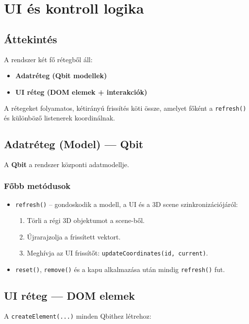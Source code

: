 \documentclass[12pt]{article}
\begin{document}
    \section{UI és kontroll logika}

    \subsection{Áttekintés}
	A rendszer két fő rétegből áll: 
	
	\begin{itemize}
		\item \textbf{Adatréteg (Qbit modellek)}
		\item \textbf{UI réteg (DOM elemek + interakciók)}
	\end{itemize}
	
	A rétegeket folyamatos, kétirányú frissítés köti össze, amelyet főként a \texttt{refresh()} és különböző listenerek koordinálnak.
	
	\subsection{Adatréteg (Model) --- Qbit}
	A \textbf{Qbit} a rendszer központi adatmodellje.
	
	\subsubsection{Főbb metódusok}
	\begin{itemize}
		\item \texttt{refresh()} -- gondoskodik a modell, a UI és a 3D scene szinkronizációjáról:
		\begin{enumerate}
			\item Törli a régi 3D objektumot a scene-ből.
			\item Újrarajzolja a frissített vektort.
			\item Meghívja az UI frissítőt: \texttt{updateCoordinates(id, current)}.
		\end{enumerate}
		\item \texttt{reset()}, \texttt{remove()} és a kapu alkalmazása után mindig \texttt{refresh()} fut.
	\end{itemize}
	
	\subsection{UI réteg --- DOM elemek}
	A \texttt{createElement(...)} minden Qbithez létrehoz:
	
\end{document}
